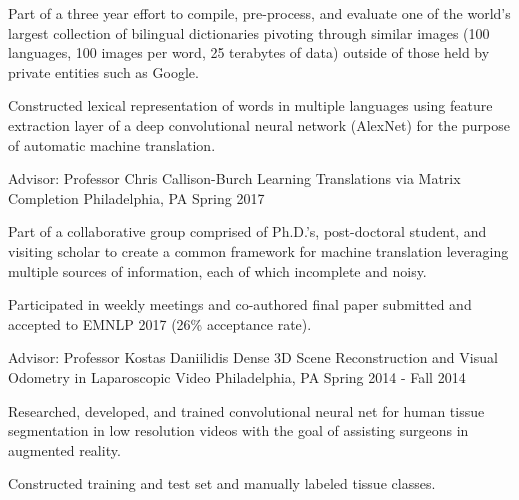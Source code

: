 \begin{cventries}
{      \begin{cvitems}
        \item {Part of a three year effort to compile, pre-process, and evaluate one of the world’s largest collection of bilingual dictionaries pivoting through similar images (100 languages, 100 images per word, 25 terabytes of data) outside of those held by private entities such as Google.}
        \item {Constructed lexical representation of words in multiple languages using feature extraction layer of a deep convolutional neural network (AlexNet) for the purpose of automatic machine translation.}
      \end{cvitems} 
    }
  \cventry
    {Advisor: Professor Chris Callison-Burch}
    {Learning Translations via Matrix Completion}
    {Philadelphia, PA}
    {Spring 2017}
    {
      \begin{cvitems}
         \item {Part of a collaborative group comprised of Ph.D.’s, post-doctoral student, and visiting scholar to create a common framework for machine translation leveraging multiple sources of information, each of which incomplete and noisy.}
        \item {Participated in weekly meetings and co-authored final paper submitted and accepted to EMNLP 2017 (26\% acceptance rate).}
      \end{cvitems}
    }
  \cventry
    {Advisor: Professor Kostas Daniilidis}
    {Dense 3D Scene Reconstruction and Visual Odometry in Laparoscopic Video}
    {Philadelphia, PA}
    {Spring 2014 - Fall 2014}
    {
      \begin{cvitems}
        \item {Researched, developed, and trained convolutional neural net for human tissue segmentation in low resolution videos with the goal of assisting surgeons in augmented reality.}
        \item {Constructed training and test set and manually labeled tissue classes.}
      \end{cvitems}
    }
\end{cventries}
